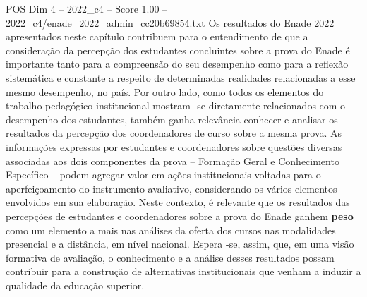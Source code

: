 \begin{textsample}{POS Dim 4 – 2022\_c4 – Score 1.00 – 2022\_c4/enade\_2022\_admin\_cc20b69854.txt}
Os resultados do Enade 2022 apresentados neste capítulo contribuem para o entendimento de que a consideração da percepção dos estudantes concluintes sobre a prova do Enade é importante tanto para a compreensão do seu desempenho como para a reflexão sistemática e constante a respeito de determinadas realidades relacionadas a esse mesmo desempenho, no país.
Por outro lado, como todos os elementos do trabalho pedagógico institucional mostram -se diretamente relacionados com o desempenho dos estudantes, também ganha relevância conhecer e analisar os resultados da percepção dos coordenadores de curso sobre a mesma prova.
As informações expressas por estudantes e coordenadores sobre questões diversas associadas aos dois componentes da prova – Formação Geral e Conhecimento Específico – podem agregar valor em ações institucionais voltadas para o aperfeiçoamento do instrumento avaliativo, considerando os vários elementos envolvidos em sua elaboração.
Neste contexto, é relevante que os resultados das percepções de estudantes e coordenadores sobre a prova do Enade ganhem \textbf{peso} como um elemento a mais nas análises da oferta dos cursos nas modalidades presencial e a distância, em nível nacional.
Espera -se, assim, que, em uma visão formativa de avaliação, o conhecimento e a análise desses resultados possam contribuir para a construção de alternativas institucionais que venham a induzir a qualidade da educação superior.

\end{textsample}
